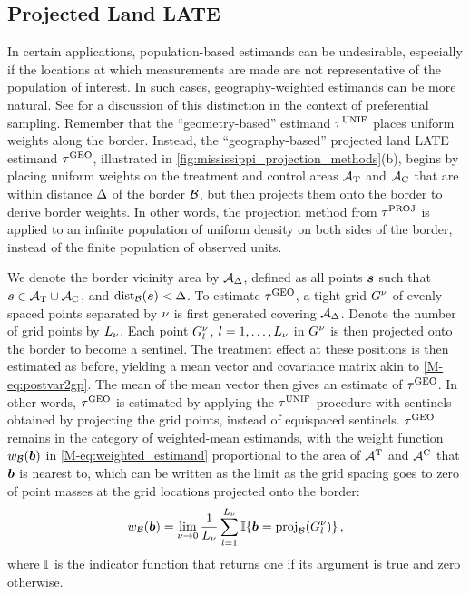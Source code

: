 \documentclass[letter,12pt]{article}
\begin{document}
\subsection{Projected Land LATE}
In certain applications, population-based estimands can be undesirable, especially if the locations at which measurements are made are not representative of the population of interest.
In such cases, geography-weighted estimands can be more natural.
See \cite{antonelli2016positive} for a discussion of this distinction in the context of preferential sampling.
Remember that the ``geometry-based'' estimand \(\tau^{\mathrm{UNIF}}\) places uniform weights along the border.
Instead, the ``geography-based'' projected land LATE estimand \(\tau^{\mathrm{GEO}}\), illustrated in \autoref{fig:mississippi_projection_methods}(b), begins by placing uniform weights on the treatment and control areas \(\mathcal{A}_{\mathrm{T}}\) and \(\mathcal{A}_{\mathrm{C}}\) that are within distance \(\Delta\) of the border \(\mathcal{B}\), but then projects them onto the border to derive border weights.
In other words, the projection method from \(\tau^{\mathrm{PROJ}}\) is applied to an infinite population of uniform density on both sides of the border, instead of the finite population of observed units.

We denote the border vicinity area by \(\mathcal{A}_\Delta\), defined as all points \(\bm{s}\) such that \(\bm{s} \in {\mathcal{A}_{\mathrm{T}}\cup \mathcal{A}_{\mathrm{C}}}\), and \(\dist_{\border}\del{\svec} < \buffer\).
To estimate \(\tau^{\mathrm{GEO}}\), a tight grid \(G^\nu\) of evenly spaced points separated by \(\nu\) is first generated covering \(\mathcal{A}_\Delta\).
Denote the number of grid points by \(L_\nu\).
Each point \(G^\nu_l\), \(l=1,\dotsc,L_\nu\) in \(G^\nu\) is then projected onto the border to become a sentinel.
The treatment effect at these positions is then estimated as before, yielding a mean vector and covariance matrix akin to \autoref*{M-eq:postvar2gp}.
The mean of the mean vector then gives an estimate of \(\tau^{\mathrm{GEO}}\).
In other words, \(\tau^{\mathrm{GEO}}\) is estimated by applying the \(\tau^{\mathrm{UNIF}}\) procedure with sentinels obtained by projecting the grid points, instead of equispaced sentinels.
\(\tau^{\mathrm{GEO}}\) remains in the category of weighted-mean estimands, with the weight function \(w_{\mathcal{B}}(\bm{b})\) in \autoref*{M-eq:weighted_estimand} proportional to the area of \(\mathcal{A}{}^{\mathrm{T}}\) and \(\mathcal{A}{}^{\mathrm{C}}\) that \(\bm{b}\) is nearest to, which can be written as the limit as the grid spacing goes to zero of point masses at the grid locations projected onto the border:
\begin{equation}
    \weightb(\sentinel) = \lim_{\gridres \rightarrow 0}\frac{1}{L_\gridres}\sum_{l=1}^{L_\gridres} \Ind\cbr{\sentinel = \proj_{\border}\del{\grid_l} }\,,
\end{equation}
where \(\operatorname{\mathbb{I}}\) is the indicator function that returns one if its argument is true and zero otherwise.
\end{document}
